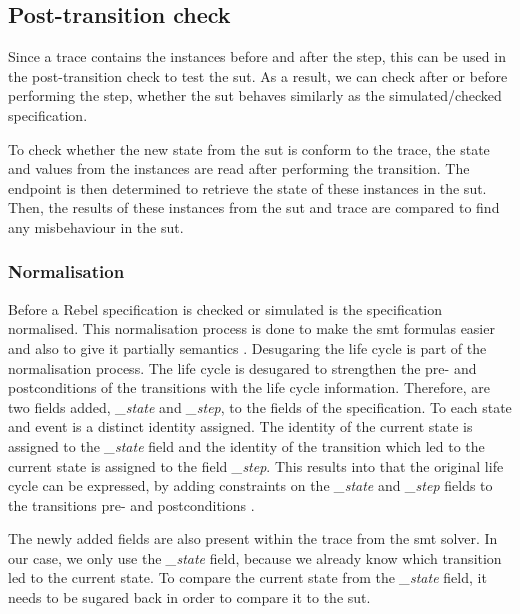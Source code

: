 \subsection{Post-transition check}

Since a trace contains the instances before and after the step, this can be used
in the post-transition check to test the \gls{sut}. As a result, we can check after or
before performing the step, whether the \gls{sut} behaves similarly as the
simulated/checked specification.

To check whether the new state from the \gls{sut} is
conform to the trace, the state and values from the instances are read after
performing the transition. The endpoint is then determined to retrieve the state
of these instances in the \gls{sut}. Then, the results of these instances from the \gls{sut}
and trace are compared to find any misbehaviour in the \gls{sut}.

\subsubsection{Normalisation}

Before a Rebel specification is checked or simulated is the specification
normalised. This normalisation process is done to make the \gls{smt} formulas easier
and also to give it partially semantics
\cite[p.5]{stoel_storm_vinju_bosman_2016}. Desugaring the life cycle is part of
the normalisation process. The life cycle is desugared to strengthen the pre-
and postconditions of the transitions with the life cycle information.
Therefore, are two fields added, \textit{\_state} and \textit{\_step}, to the fields of the
specification. To each state and event is a distinct identity assigned. The
identity of the current state is assigned to the \textit{\_state} field and the identity
of the transition which led to the current state is assigned to the field
\textit{\_step}. This results into that the original life cycle can be expressed, by
adding constraints on the \textit{\_state} and \textit{\_step} fields to the transitions pre- and
postconditions \cite[p.5]{stoel_storm_vinju_bosman_2016}.

The newly added fields
are also present within the trace from the \gls{smt} solver. In our case, we only use
the \textit{\_state} field, because we already know which transition led to the current
state. To compare the current state from the \textit{\_state} field, it needs to be
sugared back in order to compare it to the \gls{sut}.

